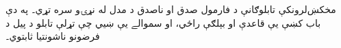 \documentclass[../../../include/open-logic-chapter]{subfiles}
\begin{document}

\begin{editorial}
  مخکښ‌لرونکې تابلوګانې د فارمول صدق او ناصدق د مدل له
  نړۍو سره تړي۔ په دې باب کښې يې قاعدې او بېلګې راځي، او
  سموالے يې ښيي چې تړلې تابلو د پيل د فرضونو ناشونتيا ثابتوي۔
\end{editorial}


\OLEndChapterHook
\end{document}
